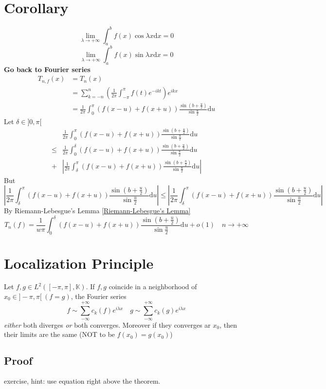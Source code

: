 \documentclass{book}
\newcommand{\abs}[1]{\left\lvert #1 \right\rvert}
\newcommand{\leftbracket}{[}
\newcommand{\rightbracket}{]}
\begin{document}
\section{Corollary}
$$\lim\limits_{\lambda\rightarrow+\infty}\int_a^bf(x)\cos\lambda x\text{d}x=0$$
$$\lim\limits_{\lambda\rightarrow+\infty}\int_a^bf(x)\sin\lambda x\text{d}x=0$$
\textbf{Go back to Fourier series}
$$\begin{aligned}
    T_{n,f}(x) &=T_n(x)\\ &=\sum\limits_{k=-n}^n\left(\frac{1}{2\pi}\int_{-\pi}^\pi f(t)e^{-ikt}\right)e^{ikx}\\
    &=\frac{1}{2\pi}\int_0^\pi\left(f(x-u)+f(x+u)\right)\frac{\sin(b+\frac{u}2)}{\sin\frac{u}2}\text{d}u
\end{aligned}$$
Let $\delta\in \rightbracket 0,\pi\leftbracket$
$$\begin{aligned}
    &\frac{1}{2\pi}\int_0^\pi\left(f(x-u)+f(x+u)\right)\frac{\sin(b+\frac{u}2)}{\sin\frac{u}2}\text{d}u\\
    \leq&\frac{1}{2\pi}\int_0^\delta\left(f(x-u)+f(x+u)\right)\frac{\sin(b+\frac{u}2)}{\sin\frac{u}2}\text{d}u\\+&\abs{\frac{1}{2\pi}\int_\delta^\pi\left(f(x-u)+f(x+u)\right)\frac{\sin(b+\frac{u}2)}{\sin\frac{u}2}\text{d}u}
\end{aligned}$$
But
$$\abs{\frac{1}{2\pi}\int_\delta^\pi\left(f(x-u)+f(x+u)\right)\frac{\sin(b+\frac{u}2)}{\sin\frac{u}2}\text{d}u}\leq\abs{\frac{1}{2\pi}\int_\delta^\pi\left(f(x-u)+f(x+u)\right)\frac{\sin(b+\frac{u}2)}{\sin\frac{u}2}\text{d}u}$$
By Riemann-Lebesgue's Lemma \ref{Riemann-Lebesgue's Lemma}
$$T_n(f)=\frac{1}{w\pi}\int_0^\delta\left(f(x-u)+f(x+u)\right)\frac{\sin(b+\frac{u}2)}{\sin\frac{u}2}\text{d}u+o(1)\quad n\rightarrow+\infty$$

\section{Localization Principle}\label{Localization Principle}
Let $f,g\in L^2([-\pi,\pi],\mathbb{K})$. If $f,g$ coincide in a neighborhood of $x_0\in \rightbracket -\pi,\pi\leftbracket\ (f=g)$, the Fourier series $$f\sim\sum\limits_{-\infty}^{+\infty}c_k(f)e^{i\lambda x}\quad g\sim\sum\limits_{-\infty}^{+\infty} c_k(g)e^{i\lambda x}$$
\textit{either} both diverges \textit{or} both converges. Moreover if they converges ar $x_0$, then their limits are the same (NOT to be $f(x_0)=g(x_0)$)
\subsection*{Proof}exercise, hint: use equation right above the theorem.
\end{document}
